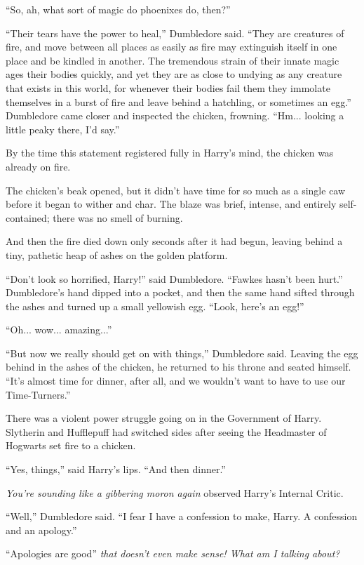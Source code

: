 ``So, ah, what sort of magic do phoenixes do, then?''

``Their tears have the power to heal,'' Dumbledore said. ``They are
creatures of fire, and move between all places as easily as fire may
extinguish itself in one place and be kindled in another. The tremendous
strain of their innate magic ages their bodies quickly, and yet they are
as close to undying as any creature that exists in this world, for
whenever their bodies fail them they immolate themselves in a burst of
fire and leave behind a hatchling, or sometimes an egg.'' Dumbledore
came closer and inspected the chicken, frowning. ``Hm... looking a
little peaky there, I'd say.''

By the time this statement registered fully in Harry's mind, the chicken
was already on fire.

The chicken's beak opened, but it didn't have time for so much as a
single caw before it began to wither and char. The blaze was brief,
intense, and entirely self-contained; there was no smell of burning.

And then the fire died down only seconds after it had begun, leaving
behind a tiny, pathetic heap of ashes on the golden platform.

``Don't look so horrified, Harry!'' said Dumbledore. ``Fawkes hasn't
been hurt.'' Dumbledore's hand dipped into a pocket, and then the same
hand sifted through the ashes and turned up a small yellowish egg.
``Look, here's an egg!''

``Oh... wow... amazing...''

``But now we really should get on with things,'' Dumbledore said.
Leaving the egg behind in the ashes of the chicken, he returned to his
throne and seated himself. ``It's almost time for dinner, after all, and
we wouldn't want to have to use our Time-Turners.''

There was a violent power struggle going on in the Government of Harry.
Slytherin and Hufflepuff had switched sides after seeing the Headmaster
of Hogwarts set fire to a chicken.

``Yes, things,'' said Harry's lips. ``And then dinner.''

\emph{You're sounding like a gibbering moron again} observed Harry's
Internal Critic.

``Well,'' Dumbledore said. ``I fear I have a confession to make, Harry.
A confession and an apology.''

``Apologies are good'' \emph{that doesn't even make sense! What am I
talking about?}

